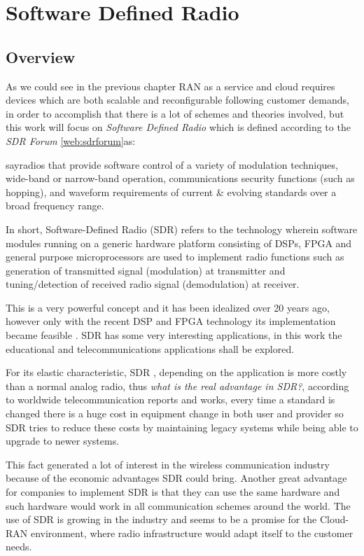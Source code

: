 \chapter{Software Defined Radio}

\section{Overview}
\label{sdr:overview}

As we could see in the previous chapter RAN as a service and cloud requires
devices which are both scalable and reconfigurable following customer demands,
in order to accomplish that there is a lot of schemes and theories involved,
but this work will focus on \emph{Software Defined Radio} which is defined
according to the \emph{SDR Forum} \ref{web:sdrforum}as:

say{radios that provide software control of a variety of modulation techniques,
wide-band or narrow-band operation, communications security functions
(such as hopping), and waveform requirements of current & evolving standards
over a broad frequency range.}

In short, Software-Defined Radio (SDR) refers to the technology wherein software
 modules running on a generic hardware platform consisting of DSPs, FPGA and
 general purpose microprocessors are used to implement radio functions such as
 generation of transmitted signal (modulation) at transmitter and tuning/detection
 of received radio signal (demodulation) at receiver.


This is a very powerful concept and it has been idealized over 20 years ago,
however only with the recent DSP and FPGA technology its implementation became
feasible \cite{ladimer2009}. SDR has some very interesting applications, in this
work the educational and telecommunications applications shall be explored.

For its elastic characteristic, SDR , depending on the application is more
costly than a normal analog radio, thus \emph{what is the real advantage in SDR?},
according to worldwide telecommunication reports and works, every time a standard
is changed there is a huge cost in equipment change in both user and provider so
SDR tries to reduce these costs by maintaining legacy systems while being able
to upgrade to newer systems\cite{dayananda2012}.

This fact generated a lot of interest in the wireless communication industry
because of the economic advantages SDR could bring. Another great advantage
for companies to implement SDR is that they can use the same hardware and such
hardware would work in all communication schemes around the world. The use of
SDR is growing in the industry and seems to be a promise for the Cloud-RAN
environment, where radio infrastructure would adapt itself to the customer needs.


